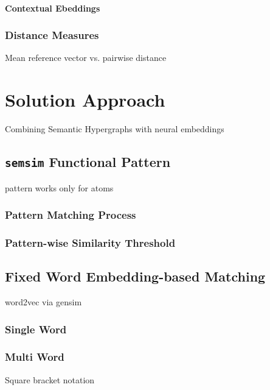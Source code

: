 \documentclass[11pt]{scrreprt}
\begin{document}
\subsubsection{Contextual Ebeddings}


\subsection{Distance Measures}

Mean reference vector vs. pairwise distance




\chapter{Solution Approach}

Combining Semantic Hypergraphs with neural embeddings

\section{\texttt{semsim} Functional Pattern}
pattern works only for atoms


\subsection{Pattern Matching Process}

\subsection{Pattern-wise Similarity Threshold}


\section{Fixed Word Embedding-based Matching}
word2vec via gensim

\subsection{Single Word}

\subsection{Multi Word}
\label{sec:semsim-multi-word}
Square bracket notation 
\end{document}
